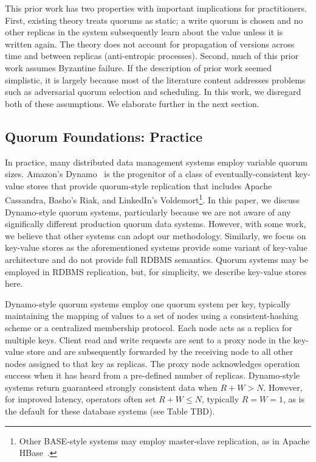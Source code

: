 \documentclass{vldb}
\begin{document}
This prior work has two properties with important implications for
practitioners.  First, existing theory treats quorums as static; a
write quorum is chosen and no other replicas in the system
subsequently learn about the value unless it is written again.  The
theory does not account for propagation of versions across time and
between replicas (anti-entropic processes).  Second, much of this
prior work assumes Byzantine failure.  If the description of prior
work seemed simplistic, it is largely because most of the literature
content addresses problems such as adversarial quorum selection and
scheduling.  In this work, we disregard both of these assumptions.  We
elaborate further in the next section.

\subsection{Quorum Foundations: Practice}
\label{sec:practice}

In practice, many distributed data management systems employ variable
quorum sizes. Amazon's Dynamo~\cite{dynamo} is the progenitor of a
class of eventually-consistent key-value stores that provide
quorum-style replication that includes Apache Cassandra, Basho's Riak,
and LinkedIn's Voldemort\footnote{Other BASE-style systems may employ
  master-slave replication, as in Apache HBase~\cite{hbase}.}.  In
this paper, we discuss Dynamo-style quorum systems, particularly
because we are not aware of any significally different production
quorum data systems.  However, with some work, we believe that other
systems can adopt our methodology.  Similarly, we focus on key-value
stores as the aforementioned systems provide some variant of key-value
architecture and do not provide full RDBMS semantics.  Quorum systems
may be employed in RDBMS replication, but, for simplicity, we describe
key-value stores here.

Dynamo-style quorum systems employ one quorum system per key,
typically maintaining the mapping of values to a set of nodes using a
consistent-hashing scheme or a centralized membership protocol. Each
node acts as a replica for multiple keys.  Client read and write
requests are sent to a proxy node in the key-value store and are
subsequently forwarded by the receiving node to all other nodes
assigned to that key as replicas.  The proxy node acknowledges
operation success when it has heard from a pre-defined number of
replicas.  Dynamo-style systems return guaranteed strongly consistent
data when $R+W > N$.  However, for improved latency, operators often
set $R+W \leq N$, typically $R=W=1$, as is the default for these
database systems (see Table TBD).
\end{document}
